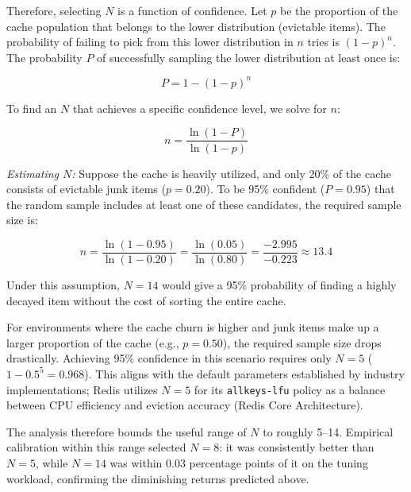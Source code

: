 Therefore, selecting $N$ is a function of confidence. Let $p$ be the proportion of the cache population that belongs to the lower distribution (evictable items). The probability of failing to pick from this lower distribution in $n$ tries is $(1-p)^n$. The probability $P$ of successfully sampling the lower distribution at least once is:

\begin{equation}
P = 1 - (1-p)^n
\end{equation}

To find an $N$ that achieves a specific confidence level, we solve for $n$:

\begin{equation}
n = \frac{\ln(1 - P)}{\ln(1 - p)}
\end{equation}

\textit{Estimating $N$:} Suppose the cache is heavily utilized, and only 20\% of the cache consists of evictable junk items ($p = 0.20$). To be 95\% confident ($P = 0.95$) that the random sample includes at least one of these candidates, the required sample size is:

\begin{equation}
n = \frac{\ln(1 - 0.95)}{\ln(1 - 0.20)} = \frac{\ln(0.05)}{\ln(0.80)} = \frac{-2.995}{-0.223} \approx 13.4
\end{equation}

Under this assumption, $N = 14$ would give a 95\% probability of finding a highly decayed item without the cost of sorting the entire cache.

For environments where the cache churn is higher and junk items make up a larger proportion of the cache (e.g., $p = 0.50$), the required sample size drops drastically. Achieving 95\% confidence in this scenario requires only $N = 5$ ($1 - 0.5^5 = 0.968$). This aligns with the default parameters established by industry implementations; Redis utilizes $N = 5$ for its \texttt{allkeys-lfu} policy as a balance between CPU efficiency and eviction accuracy (Redis Core Architecture).

The analysis therefore bounds the useful range of $N$ to roughly 5--14. Empirical calibration within this range selected $N = 8$: it was consistently better than $N = 5$, while $N = 14$ was within 0.03 percentage points of it on the tuning workload, confirming the diminishing returns predicted above.

